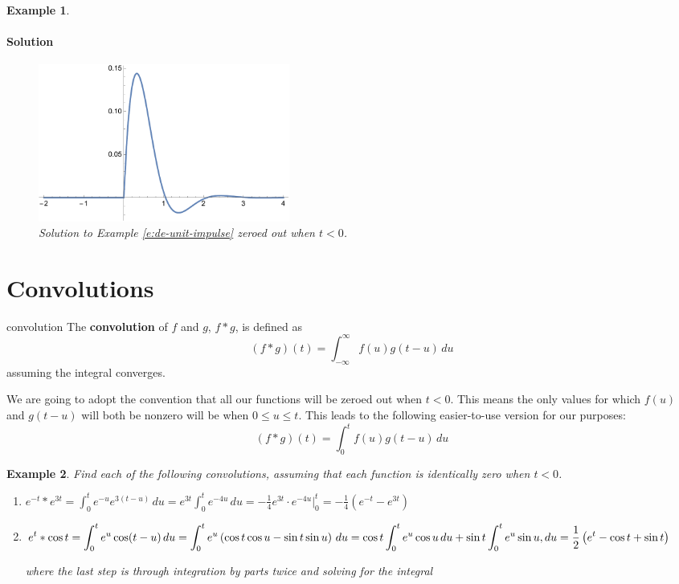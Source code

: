 \documentclass[letterpaper, 11pt, openany]{book}
\theoremstyle{mytheoremstyle}
\theoremstyle{myexamplestyle}
\newtheorem{example}{Example}[section]
\newenvironment{solution}{\paragraph{\sffamily \smaller \fontseries{b}\selectfont Solution}}{\hfill\faSquare}
\begin{document}
\begin{example}
\begin{solution}
\begin{figure}[htbp]
            \centering
            \includegraphics[width=0.4\textwidth]{Figures/de-unit-impulse-response-zeroed.pdf}
            \caption{Solution to Example \ref{e:de-unit-impulse} zeroed out when \(t<0\).}
            \label{f:de-unit-impulse-zeroed}
        \end{figure}
    \end{solution}
\end{example}
\section{Convolutions}
\setcounter{figure}{0}
\begin{definition}{}{convolution}
    The \textbf{convolution} of \(f\) and \(g\), \(f*g\), is defined as
    \[(f*g)(t) = \int_{-\infty}^{\infty} f(u)g(t-u)\, du\]
    assuming the integral converges.
\end{definition}

We are going to adopt the convention that all our functions will be zeroed out when \(t < 0\). This means the only values for which \(f(u)\) and \(g(t-u)\) will both be nonzero will be when \(0 \leq u \leq t\). This leads to the following easier-to-use version for our purposes:
\begin{equation}\label{d:convolution-zeroed}
    (f*g)(t) = \int_{0}^{t} f(u)g(t-u)\, du
\end{equation}


\begin{example}
    Find each of the following convolutions, assuming that each function is identically zero when \(t < 0\).
    \begin{enumerate}
        \item \(\displaystyle e^{-t} * e^{3t} = \int_{0}^{t} e^{-u}e^{3(t-u)}\, du = e^{3t} \int_{0}^{t} e^{-4u}\, du = -\frac{1}{4}e^{3t}\cdot e^{-4u} \bigg|_{0}^{t} = -\frac{1}{4}\left(e^{-t} - e^{3t}\right)\)
        \item \(\displaystyle e^{t} * \cos t = \int_{0}^{t} e^{u}\cos (t-u)\, du = \int_{0}^{t} e^{u}\left(\cos t \cos u - \sin t \sin u\right)\, du \\ = \cos t \int_{0}^{t} e^{u} \cos u \, du + \sin t \int_{0}^{t} e^{u} \sin u 
        , du = \frac{1}{2}\left(e^{t} -\cos t + \sin t\right)\)
        
        where the last step is through integration by parts twice and solving for the integral \faMeh
    \end{enumerate} 
\end{example}
\end{document}
